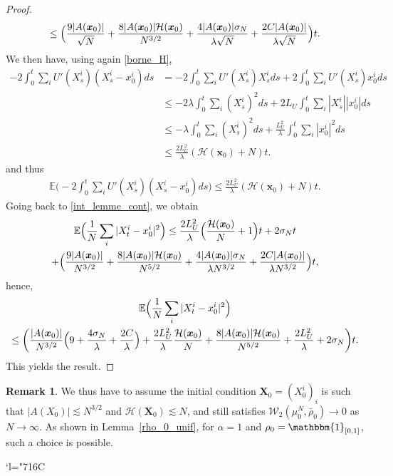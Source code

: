 \documentclass[JEP,XML,SOM,Unicode,published]{cedram}
\newcommand{\Changelback}{\mathcode`l="716C}
\let\mathds\mathbbm
\newcommand{\bx}{{\boldsymbol{x}}}
\newcommand{\bX}{{\boldsymbol{X}}}
\theoremstyle{plain}
\theoremstyle{definition}
\newtheorem{remark}{Remark}[section]
\begin{document}
\begin{proof}
\begin{multline*}
\leq \Bigl(\frac{9|A(\bx_0)|}{\sqrt{N}}+\frac{8|A(\bx_0)|\mathcal{H}(\bx_0)}{N^{3/2}}+\frac{4|A(\bx_0)|\sigma_N}{\lambda\sqrt{N}}+\frac{2C|A(\bx_0)|}{\lambda \sqrt{N}}\Bigr)t.
\end{multline*}
We then have, using again \eqref{borne_H},
\begin{align*}
-2 \int_0^t\sum_iU'(X^i_s)(X^i_s-x^i_0)ds&=-2\int_0^t\sum_iU'(X^i_s)X^i_sds+2\int_0^t\sum_iU'(X^i_s)x^i_0ds\\
&\leq -2\lambda\int_0^t\sum_i(X^i_s)^2ds+2L_U\int_0^t\sum_i|X^i_s||x^i_0|ds\\
&\leq -\lambda\int_0^t\sum_i(X^i_s)^2ds+\frac{L_U^2}{\lambda}\int_0^t\sum_i|x^i_0|^2ds\\
&\leq \frac{2L_U^2}{\lambda}(\mathcal{H}(\bx_0)+N)t.
\end{align*}
and thus
\begin{align*}
\mathbb{E}\biggl(-2\int_0^t\sum_iU'(X^i_s)(X^i_s-x^i_0)ds\biggr)\leq \frac{2L_U^2}{\lambda}(\mathcal{H}(\bx_0)+N)t.
\end{align*}
Going back to \eqref{int_lemme_cont}, we obtain
\begin{multline*}
\mathbb{E}\Bigl(\frac{1}{N}\sum_{i}|X^i_t-x^i_0|^2\Bigr)\leq \frac{2L_U^2}{\lambda}\Bigl(\frac{\mathcal{H}(\bx_0)}{N}+1\Bigr)t+2\sigma_N t\\
+\Bigl(\frac{9|A(\bx_0)|}{N^{3/2}}+\frac{8|A(\bx_0)|\mathcal{H}(\bx_0)}{N^{5/2}}+\frac{4|A(\bx_0)|\sigma_N}{\lambda N^{3/2}}+\frac{2C|A(\bx_0)|}{\lambda N^{3/2}}\Bigr)t,
\end{multline*}
hence,
\begin{multline*}
\mathbb{E}\Bigl(\frac{1}{N}\sum_{i}|X^i_t-x^i_0|^2\Bigr)\\
\leq \biggl(\frac{|A(\bx_0)|}{N^{3/2}}\Bigl(9+\frac{4\sigma_N}{\lambda}+\frac{2C}{\lambda}\Bigr)
+\frac{2L_U^2}{\lambda}\frac{\mathcal{H}(\bx_0)}{N}+\frac{8|A(\bx_0)|\mathcal{H}(\bx_0)}{N^{5/2}}+\frac{2L_U^2}{\lambda}+2\sigma_N\biggr)t.
\end{multline*}
This yields the result.
\end{proof}

\begin{remark}
We thus have to assume the initial condition $\bX_0=\left(X^i_0\right)_i$ is such that $|A(X_0)|\lesssim N^{3/2}$ and $\mathcal{H}(\bX_0)\lesssim N$, and still satisfies $\mathcal{W}_2(\mu^N_0,\bar{\rho}_0)\to0$ as $N\to\infty$. As shown in Lemma~\ref{rho_0_unif}, for $\alpha=1$ and $\rho_0=\mathds{1}_{[0,1]}$, such a choice is possible.
\end{remark}

\Changelback

\backmatter


\end{document}
